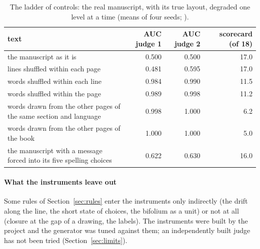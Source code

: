 \begin{table}[htbp]
\centering\footnotesize
\caption{The ladder of controls: the real manuscript, with its true layout, degraded one level at a time (means of four
seeds; ).}
\label{tab:ladder}
\begin{tabularx}{\linewidth}{Yrrr}
\toprule
text & AUC judge 1 & AUC judge 2 & scorecard (of 18) \\
\midrule
the manuscript as it is & 0.500 & 0.500 & 17.0 \\
lines shuffled within each page & 0.481 & 0.595 & 17.0 \\
words shuffled within each line & 0.984 & 0.990 & 11.5 \\
words shuffled within the page & 0.989 & 0.998 & 11.2 \\
words drawn from the other pages of the same section and language & 0.998 & 1.000 & 6.2 \\
words drawn from the other pages of the book & 1.000 & 1.000 & 5.0 \\
the manuscript with a message forced into its five spelling choices & 0.622 & 0.630 & 16.0 \\
\bottomrule
\end{tabularx}
\end{table}

\paragraph{What the instruments leave out} Some rules of Section~\ref{sec:rules} enter the instruments only indirectly
(the drift along the line, the short state of choices, the bifolium as a unit) or not at all (closure at the gap of a
drawing, the labels). The instruments were built by the project and the generator was tuned against them; an
independently built judge has not been tried (Section~\ref{sec:limits}).
